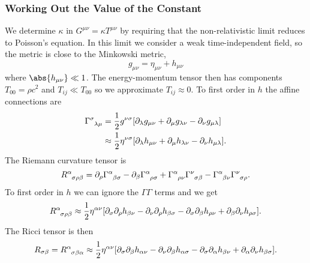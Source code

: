 \documentclass[fleqn]{NotesClass}
\newcommand*{\christoffel}[3]{\tensor{\Gamma}{^{#1}_{{#2}{#3}}}}
\begin{document}
    \subsubsection{Working Out the Value of the Constant}
    We determine \(\kappa\) in \(G^{\mu\nu} = \kappa T^{\mu\nu}\) by requiring that the non-relativistic limit reduces to Poisson's equation.
    In this limit we consider a weak time-independent field, so the metric is close to the Minkowski metric,
    \begin{equation}
        g_{\mu\nu} = \eta_{\mu\nu} + h_{\mu\nu}
    \end{equation}
    where \(\abs{h_{\mu\nu}} \ll 1\).
    The energy-momentum tensor then has components \(T_{00} = \rho c^2\) and \(T_{ij} \ll T_{00}\) so we approximate \(T_{ij} \approx 0\).
    To first order in \(h\) the affine connections are
    \begin{align}
        \christoffel{\sigma}{\lambda}{\mu} &= \frac{1}{2}g^{\nu\sigma} [\partial_\lambda g_{\mu\nu} + \partial_\mu g_{\lambda\nu} - \partial_\nu g_{\mu\lambda}]\\
        &\approx \frac{1}{2}\eta^{\nu\sigma} [\partial_\lambda h_{\mu\nu} + \partial_\mu h_{\lambda\nu} - \partial_\nu h_{\mu\lambda}].
    \end{align}
    The Riemann curvature tensor is
    \begin{equation}
        \tensor{R}{^\alpha_{\sigma\rho\beta}} = \partial_\rho \christoffel{\alpha}{\beta}{\sigma} - \partial_\beta \christoffel{\alpha}{\rho}{\sigma} + \christoffel{\alpha}{\rho}{\nu}\christoffel{\nu}{\sigma}{\beta} - \christoffel{\alpha}{\beta}{\nu}\christoffel{\nu}{\sigma}{\rho}.
    \end{equation}
    To first order in \(h\) we can ignore the \(\Gamma\Gamma\) terms and we get
    \begin{equation}
        \tensor{R}{^\alpha_{\sigma\rho\beta}} \approx \frac{1}{2}\eta^{\alpha\nu} [\partial_\sigma\partial_\rho h_{\beta\nu} - \partial_\nu\partial_\rho h_{\beta\sigma} - \partial_\sigma\partial_\beta h_{\rho\nu} + \partial_\beta\partial_\nu h_{\rho\sigma}].
    \end{equation}
    The Ricci tensor is then
    \begin{equation}\label{eqn:ricci tensor weak field}
        R_{\sigma\beta} = \tensor{R}{^\alpha_{\sigma\beta\alpha}} \approx \frac{1}{2}\eta^{\alpha\nu} [\partial_\sigma \partial_\beta h_{\alpha\nu} - \partial_\nu\partial_\beta h_{\alpha\sigma} - \partial_\sigma\partial_\alpha h_{\beta\nu} + \partial_\alpha\partial_\nu h_{\beta\sigma}].
    \end{equation}
\end{document}
